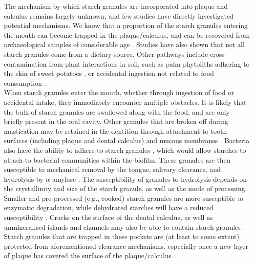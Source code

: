 \documentclass[utf8]{../templates/frontiersSCNS}
\begin{document}
The mechanism by which starch granules are incorporated into plaque and calculus
remains largely unknown, and few studies have directly investigated potential
mechanisms. We know that a proportion of the starch granules entering
the mouth can become trapped in the plaque/calculus, and can be recovered from
archaeological samples of considerable age
\citep{henryNeanderthalCalculus2014, buckleyDentalCalculus2014, wuDietEarliest2021}.
Studies have also shown that not all starch granules come from a dietary source.
Other pathways include cross-contamination from plant interactions in soil, such
as palm phytoliths adhering to the skin of sweet potatoes
\citep{trompDietaryNondietary2015},
or accidental ingestion not related to food consumption
\citep{radiniFoodPathways2017, radiniMedievalWomen2019}.\\
When starch granules enter the mouth, whether through ingestion of food or accidental
intake, they immediately encounter multiple obstacles. It is likely
that the bulk of starch granules are swallowed along with the food, and are
only briefly present in the oral cavity. Other granules that are broken off
during mastication may be retained in the dentition through attachment to
tooth surfaces (including plaque and dental calculus) and mucous membranes
\citep{kashketFoodRetention1991, doddsCarbohydrateRetention1988}.
Bacteria also have the ability to adhere to starch granules
\citep{toppingResistantStarch2003},
which would allow starches to attach to bacterial communities within the biofilm.
These granules are then
susceptible to mechanical removal by the tongue, salivary clearance, and hydrolysis
by \(\alpha\)-amylase \citep{kashketFoodParticles1996}.
The susceptibility of granules to hydrolysis depends on the crystallinity and size
of the starch granule, as well as the mode of processing. Smaller and pre-processed
(e.g., cooked) starch granules are more susceptible to enzymatic degradation,
while dehydrated starches will have a reduced susceptibility
\citep{lingstromStarchyFood1994, francoStarchDegradation1992, haslamDecompositionStarch2004, bjorckStarchProcessing1984, henryCookingStarch2009}.
Cracks on the surface of the dental calculus, as well as unmineralised islands
and channels may also be able to contain starch granules
\citep{powerSEMCalculus2014, tanCalculusUltrastructure2004, charlierSEMCalculus2010}.
Starch granules that are trapped in these pockets are (at least to some extent)
protected from aforementioned clearance mechanisms, especially once
a new layer of plaque has covered the surface of the plaque/calculus.
\end{document}
